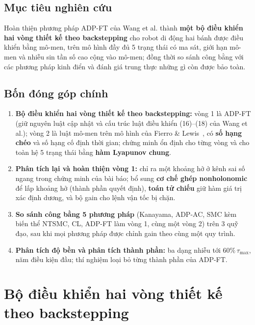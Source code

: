 \documentclass[12pt,a4paper]{article}
\begin{document}
\subsection{Mục tiêu nghiên cứu}

Hoàn thiện phương pháp ADP-FT của Wang et al. thành \textbf{một bộ điều khiển hai vòng thiết kế theo backstepping} cho robot di động hai bánh được điều khiển bằng mô-men, trên mô hình đầy đủ 5 trạng thái có ma sát, giới hạn mô-men và nhiễu sin tần số cao cộng vào mô-men; đồng thời so sánh công bằng với các phương pháp kinh điển và đánh giá trung thực những gì còn được bảo toàn.

\subsection{Bốn đóng góp chính}

\begin{enumerate}
    \item \textbf{Bộ điều khiển hai vòng thiết kế theo backstepping:} vòng 1 là ADP-FT (giữ nguyên luật cập nhật và cấu trúc luật điều khiển (16)--(18) của Wang et al.); vòng 2 là luật mô-men trên mô hình của Fierro \& Lewis~\cite{Fierro1997}, có \textbf{số hạng chéo} và số hạng cố định thời gian; chứng minh ổn định cho từng vòng và cho toàn hệ 5 trạng thái bằng \textbf{hàm Lyapunov chung}.

    \item \textbf{Phân tích lại và hoàn thiện vòng 1:} chỉ ra một khoảng hở ở kênh sai số ngang trong chứng minh của bài báo; bổ sung \textbf{cơ chế ghép nonholonomic} để lấp khoảng hở (thành phần quyết định), \textbf{toán tử chiếu} giữ hàm giá trị xác định dương, và bộ gain cho lệnh vận tốc bị chặn.

    \item \textbf{So sánh công bằng 5 phương pháp} (Kanayama, ADP-AC, SMC kèm biến thể NTSMC, CL, ADP-FT làm vòng 1, cùng một vòng 2) trên 3 quỹ đạo, sau khi mọi phương pháp được chỉnh gain theo cùng một quy trình.

    \item \textbf{Phân tích độ bền và phân tích thành phần:} ba dạng nhiễu tới $60\%\,\tau_\text{max}$, năm điều kiện đầu; thí nghiệm loại bỏ từng thành phần của ADP-FT.
\end{enumerate}

\section{Bộ điều khiển hai vòng thiết kế theo backstepping}
\end{document}
